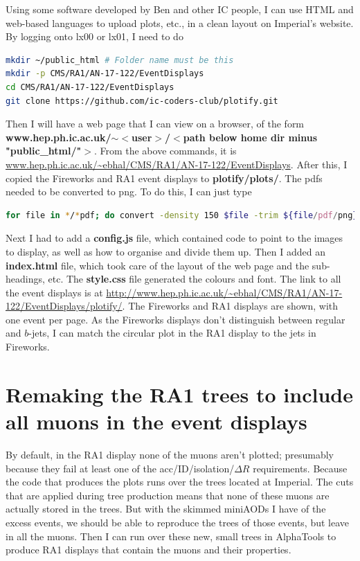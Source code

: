 Using some software developed by Ben and other IC people, I can use HTML and web-based languages to upload plots, etc., in a clean layout on Imperial's website. By logging onto lx00 or lx01, I need to do

\begin{lstlisting}[belowskip=-0.7cm, language=sh, numbers=none]
mkdir ~/public_html # Folder name must be this
mkdir -p CMS/RA1/AN-17-122/EventDisplays
cd CMS/RA1/AN-17-122/EventDisplays
git clone https://github.com/ic-coders-club/plotify.git
\end{lstlisting}

Then I will have a web page that I can view on a browser, of the form \textbf{www.hep.ph.ic.ac.uk/$\sim<$user$>$/$<$path below home dir minus "public\_html/"$>$}. From the above commands, it is \url{www.hep.ph.ic.ac.uk/~ebhal/CMS/RA1/AN-17-122/EventDisplays}. After this, I copied the Fireworks and RA1 event displays to \textbf{plotify/plots/}. The pdfs needed to be converted to png. To do this, I can just type

\begin{lstlisting}[belowskip=-0.7cm, language=sh, numbers=none]
for file in */*pdf; do convert -density 150 $file -trim ${file/pdf/png}; done
\end{lstlisting}

Next I had to add a \textbf{config.js} file, which contained code to point to the images to display, as well as how to organise and divide them up. Then I added an \textbf{index.html} file, which took care of the layout of the web page and the sub-headings, etc. The \textbf{style.css} file generated the colours and font. The link to all the event displays is at \url{http://www.hep.ph.ic.ac.uk/~ebhal/CMS/RA1/AN-17-122/EventDisplays/plotify/}. The Fireworks and RA1 displays are shown, with one event per page. As the Fireworks displays don't distinguish between regular and $b$-jets, I can match the circular plot in the RA1 display to the jets in Fireworks.

\section{Remaking the RA1 trees to include all muons in the event displays}

By default, in the RA1 display none of the muons aren't plotted; presumably because they fail at least one of the acc/ID/isolation/$\Delta R$ requirements. Because the code that produces the plots runs over the trees located at Imperial. The cuts that are applied during tree production means that none of these muons are actually stored in the trees. But with the skimmed miniAODs I have of the excess events, we should be able to reproduce the trees of those events, but leave in all the muons. Then I can run over these new, small trees in AlphaTools to produce RA1 displays that contain the muons and their properties.


